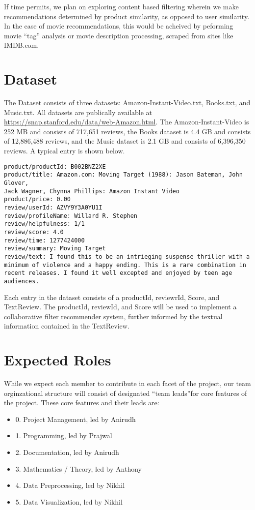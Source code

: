 \documentclass{article} %
\begin{document}
If time permits, we plan on exploring content based filtering wherein we make recommendations determined by product similarity, as opposed to user similarity. In the case of movie recommendations, this would be acheived by peforming movie ``tag'' analysis or movie description processing, scraped from sites like IMDB.com. 

\section{Dataset}

The Dataset consists of three datasets: Amazon-Instant-Video.txt, Books.txt, and Music.txt. All datasets are publically available at \url{https://snap.stanford.edu/data/web-Amazon.html}. The Amazon-Instant-Video is 252 MB and consists of 717,651 reviews, the Books dataset is 4.4 GB and consists of 12,886,488 reviews, and the Music dataset is 2.1 GB and consists of 6,396,350 reviews. A typical entry is shown below. 

\begin{verbatim}
product/productId: B002BNZ2XE
product/title: Amazon.com: Moving Target (1988): Jason Bateman, John Glover, 
Jack Wagner, Chynna Phillips: Amazon Instant Video
product/price: 0.00
review/userId: AZVY9Y3A0YU1I
review/profileName: Willard R. Stephen
review/helpfulness: 1/1
review/score: 4.0
review/time: 1277424000
review/summary: Moving Target
review/text: I found this to be an intrieging suspense thriller with a 
minimum of violence and a happy ending. This is a rare combination in 
recent releases. I found it well excepted and enjoyed by teen age 
audiences.
\end{verbatim}

Each entry in the dataset consists of a productId, reviewrId, Score, and TextReview. The productId, reviewId, and Score will be used to implement a collaborative filter recommender system, further informed by the textual information contained in the TextReview. 


\section{Expected Roles}
While we expect each member to contribute in each facet of the project, our team orginzational structure will consist of designated ``team leads''for core features of the project. These core features and their leads are:

\begin{itemize}
	\item[] 0. Project Management, led by Anirudh
	\item[] 1. Programming, led by Prajwal
	\item[] 2. Documentation, led by Anirudh
	\item[] 3. Mathematics / Theory, led by Anthony
	\item[] 4. Data Preprocessing, led by Nikhil
	\item[] 5. Data Visualization, led by Nikhil
\end{itemize}
\end{document}

